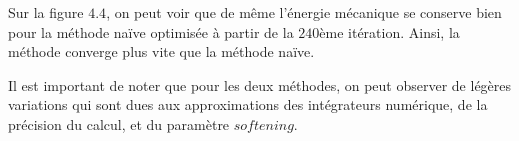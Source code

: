 \vspace{2mm}
Sur la figure $4.4$, on peut voir que de même l'énergie mécanique
se conserve bien pour la méthode naïve optimisée à partir de la
$240$ème itération. Ainsi, la méthode converge plus vite que la 
méthode naïve.

\vspace{2mm}
Il est important de noter que pour les deux méthodes, on peut
observer de légères variations qui sont dues aux approximations des
intégrateurs numérique, de la précision du calcul, et du paramètre $\textit{softening}$.
